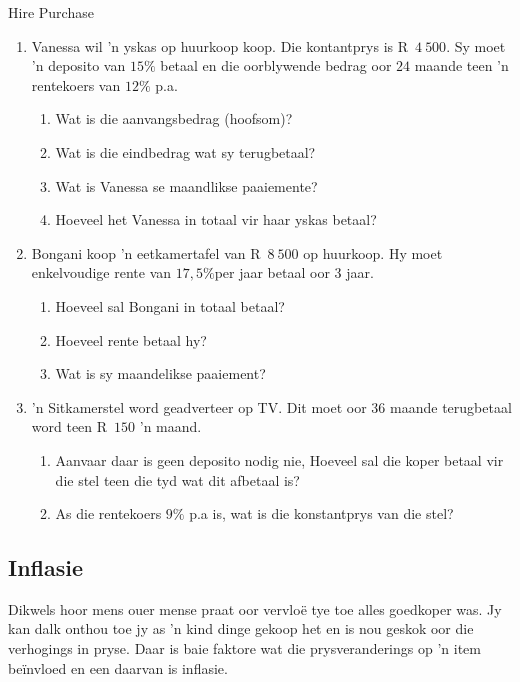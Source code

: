 \begin{exercises}{Hire Purchase}
{
    \begin{enumerate}[label=\textbf{\arabic*}.]
	\item Vanessa wil 'n yskas op huurkoop koop. Die kontantprys is R~$4~500$. Sy moet 'n deposito van $15\%$ betaal en die oorblywende bedrag oor $24$ maande teen 'n rentekoers van $12\%$ p.a.
	\begin{enumerate}
	    \item Wat is die aanvangsbedrag (hoofsom)?
	    \item Wat is die eindbedrag wat sy terugbetaal?
	    \item Wat is Vanessa se maandlikse paaiemente?
	    \item Hoeveel het Vanessa in totaal vir haar yskas betaal?
	\end{enumerate}


	\item Bongani koop ’n eetkamertafel van R~$8~500$ op huurkoop. Hy moet enkelvoudige rente van $17,5\%$per jaar betaal oor 3 jaar.
	\begin{enumerate}
	    \item Hoeveel sal Bongani in totaal betaal?
	    \item  Hoeveel rente betaal hy?
	    \item Wat is sy maandelikse paaiement?
	\end{enumerate}

	\item 'n Sitkamerstel word geadverteer op TV. Dit moet oor $36$ maande terugbetaal word teen R~$150$ 'n maand.
	\begin{enumerate}
	    \item Aanvaar daar is geen deposito nodig nie, Hoeveel sal die koper betaal vir die stel teen die tyd wat dit afbetaal is?
	    \item As die rentekoers $9\%$ p.a is, wat is die konstantprys van die stel?\\
	\end{enumerate}
    \end{enumerate}

}
\end{exercises}




\subsection{Inflasie}

Dikwels hoor mens ouer mense praat oor vervlo\"e tye toe alles goedkoper was. Jy kan dalk onthou toe jy as 'n kind dinge gekoop het en is nou geskok oor die verhogings in pryse. Daar is baie faktore wat die prysveranderings op 'n item be\"invloed en een daarvan is inflasie.\par

